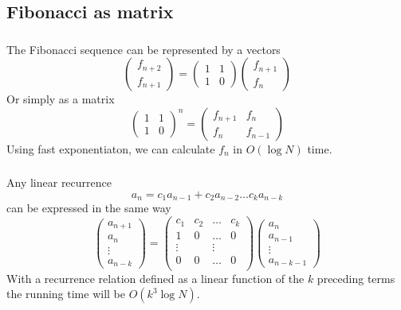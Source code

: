 \documentclass[10pt]{beamer}
\begin{document}
\subsection{Fibonacci as matrix}

\begin{frame}[fragile]
  \frametitle{\insertsubsection}
  \vspace{20pt}
  The Fibonacci sequence can be represented by a vectors
  \[
    \begin{pmatrix*}
      f_{n+2} \\
      f_{n+1}
    \end{pmatrix*}
    = 
    \begin{pmatrix*}
      1 & 1 \\
      1 & 0
    \end{pmatrix*}
    \begin{pmatrix*}
      f_{n+1} \\
      f_n
    \end{pmatrix*}
  \]
  Or simply as a matrix
  \[
    \begin{pmatrix*}
      1 & 1 \\
      1 & 0
    \end{pmatrix*}^n =
    \begin{pmatrix*}
      f_{n+1} & f_n\\
      f_n & f_{n-1}
    \end{pmatrix*}
  \]
  Using fast exponentiaton, we can calculate $f_n$ in $O(\log N)$ time.
\end{frame}

\begin{frame}
  \frametitle{\insertsubsection}
  \vspace{20pt}
  Any linear recurrence 
  \[
    a_n = c_1 a_{n-1} + c_2 a_{n-2} \ldots c_k a_{n-k}
  \]
  can be expressed in the same way
  \[
    \begin{pmatrix*}
      a_{n+1} \\
      a_{n} \\
      \vdots \\
      a_{n-k}
    \end{pmatrix*}
    =
    \begin{pmatrix}
      c_1 & c_2 & \ldots & c_k \\
      1 & 0 & \ldots & 0 \\
      \vdots & & \vdots \\
      0 & 0 & \ldots & 0 \\
    \end{pmatrix}
    \begin{pmatrix*}
      a_{n} \\
      a_{n-1} \\
      \vdots \\
      a_{n-k-1}
    \end{pmatrix*}
  \]
  With a recurrence relation defined as a linear function of the $k$ preceding
  terms the running time will be $O(k^3 \log N)$.
\end{frame}
\end{document}
